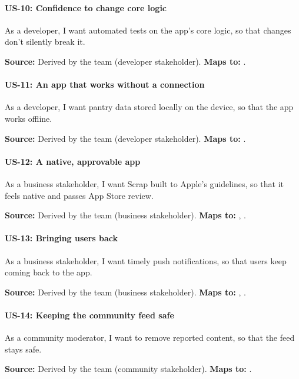 \paragraph{US-10: Confidence to change core logic}
As a developer, I want automated tests on the app's core logic, so that changes don't silently break it.

\noindent\textbf{Source:} Derived by the team (developer stakeholder). \textbf{Maps to:} .

\paragraph{US-11: An app that works without a connection}
As a developer, I want pantry data stored locally on the device, so that the app works offline.

\noindent\textbf{Source:} Derived by the team (developer stakeholder). \textbf{Maps to:} .

\paragraph{US-12: A native, approvable app}
As a business stakeholder, I want Scrap built to Apple's guidelines, so that it feels native and passes App Store review.

\noindent\textbf{Source:} Derived by the team (business stakeholder). \textbf{Maps to:} , .

\paragraph{US-13: Bringing users back}
As a business stakeholder, I want timely push notifications, so that users keep coming back to the app.

\noindent\textbf{Source:} Derived by the team (business stakeholder). \textbf{Maps to:} , .

\paragraph{US-14: Keeping the community feed safe}
As a community moderator, I want to remove reported content, so that the feed stays safe.

\noindent\textbf{Source:} Derived by the team (community stakeholder). \textbf{Maps to:} .
